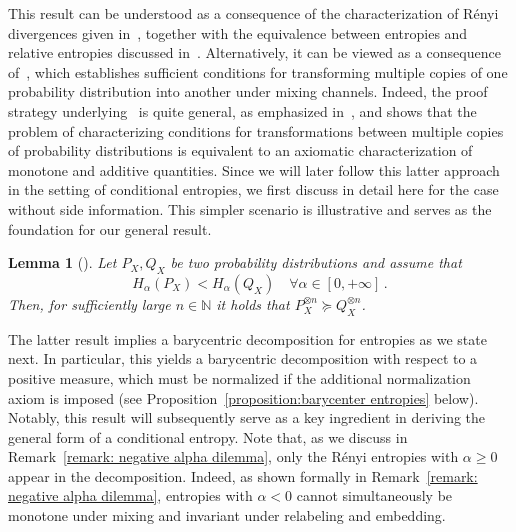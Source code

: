 \documentclass[aps,pra,11pt,onecolumn,nofootinbib,tightenlines]{revtex4-2}
\newtheorem{lemma}[theorem]{Lemma}
\theoremstyle{definition}
\begin{document}
This result can be understood as a consequence of the characterization of Rényi divergences given in~\cite[Theorem~2]{mu21_renyi}, together with the equivalence between entropies and relative entropies discussed in~\cite{gour21_axiomatic}. Alternatively, it can be viewed as a consequence of~\cite[Proposition~3.7]{Jensen_Kjaerulf_2019}, which establishes sufficient conditions for transforming multiple copies of one probability distribution into another under mixing channels.
Indeed, the proof strategy underlying~\cite[Theorem~2]{mu21_renyi} is quite general, as emphasized in~\cite{haapasalo_inprep}, and shows that the problem of characterizing conditions for transformations between multiple copies of probability distributions is equivalent to an axiomatic characterization of monotone and additive quantities. Since we will later follow this latter approach in the setting of conditional entropies, we first discuss in detail here for the case without side information. This simpler scenario is illustrative and serves as the foundation for our general result.
\begin{lemma}[{\cite[Proposition 3.7]{Jensen_Kjaerulf_2019}}]\label{lemma:Jensen}
Let $P_X,Q_X$ be two probability distributions and assume that 
\begin{equation}
    H_\alpha(P_X) < H_\alpha(Q_X)  \quad \forall \alpha\in[0,+\infty] \,.
\end{equation}
Then, for sufficiently large $n \in \mathbb{N}$ it holds that
$P_X^{\otimes n} \succeq Q_X^{\otimes n}$.
\end{lemma}
The latter result implies a barycentric decomposition for entropies as we state next.
In particular, this yields a barycentric decomposition with respect to a positive measure, which must be normalized if the additional normalization axiom is imposed (see Proposition~\ref{proposition:barycenter entropies} below).
 Notably, this result will subsequently serve as a key ingredient in deriving the general form of a conditional entropy.  Note that, as we discuss in Remark~\ref{remark: negative alpha dilemma}, only the Rényi entropies with 
$\alpha \geq 0$ appear in the decomposition. Indeed, as shown formally in Remark~\ref{remark: negative alpha dilemma}, entropies with $\alpha<0$ cannot simultaneously be monotone under mixing and invariant under relabeling and embedding.
\end{document}
